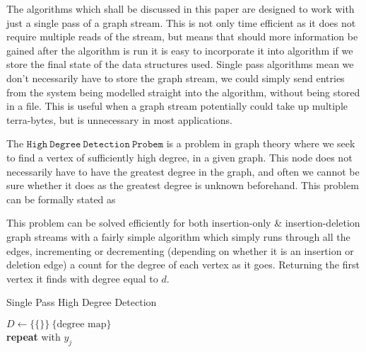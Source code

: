 \documentclass[11pt,twoside,a4paper]{report}
\begin{document}
\par The algorithms which shall be discussed in this paper are designed to work with just a single pass of a graph stream. This is not only time efficient as it does not require multiple reads of the stream, but means that should more information be gained after the algorithm is run it is easy to incorporate it into algorithm if we store the final state of the data structures used. Single pass algorithms mean we don't necessarily have to store the graph stream, we could simply send entries from the system being modelled straight into the algorithm, without being stored in a file. This is useful when a graph stream potentially could take up multiple terra-bytes, but is unnecessary in most applications.
\horizontalline
\par The $\mathtt{High\ Degree\ Detection\ Probem}$ is a problem in graph theory where we seek to find a vertex of sufficiently high degree, in a given graph. This node does not necessarily have to have the greatest degree in the graph, and often we cannot be sure whether it does as the greatest degree is unknown beforehand. This problem can be formally stated as
\vspace{.3cm}\begin{adjustwidth}{.3cm}{}\end{adjustwidth}\vspace{.3cm}
\par This problem can be solved efficiently for both insertion-only \& insertion-deletion graph streams with a fairly simple algorithm which simply runs through all the edges, incrementing or decrementing (depending on whether it is an insertion or deletion edge)  a count for the degree of each vertex as it goes. Returning the first vertex it finds with degree equal to $d$.\\
\begin{algorithm}[H]
\caption{Single Pass High Degree Detection}
$D\leftarrow\{\{\}\}\ \{\text{degree map}\}$\\
 {
	\textbf{repeat} with $y_j$
}
\end{algorithm}\vspace{.3cm}
\end{document}
